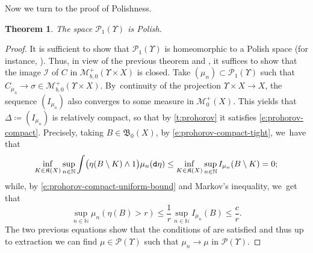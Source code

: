 \documentclass[JEP,XML,SOM,Unicode,published]{cedram}
\newtheorem{theorem}{Theorem}[section]
\theoremstyle{definition}
\theoremstyle{remark}
\DeclarePairedDelimiter{\paren}{\lparen}{\rparen}
\begin{document}
Now we turn to the proof of Polishness.

\begin{theorem}\label{t:p1-polish}
The space $\mathscr{P}_{1}(\varUpsilon)$ is Polish.
\end{theorem}
\begin{proof}
It is sufficient to show that $\mathscr{P}_{1}(\varUpsilon)$ is homeomorphic to a Polish space (for instance, \cite[IX, p.\,58, Cor.\,2]{BourbakiTopo2}).
Thus, in view of the previous theorem and \cite[IX, p.\,57, Prop.\,1]{BourbakiTopo2}, it suffices to show that the image $\mathscr{I}$ of $C$ in $\mathscr{M}^{+}_{b,0}(\varUpsilon \times X)$ is closed.
Take $(\mu_{n}) \subset \mathscr{P}_{1}(\varUpsilon)$ such that $C_{\mu_{n}} \to \sigma \in \mathscr{M}^{+}_{b,0}(\varUpsilon \times X)$.
By~continuity of the projection $\varUpsilon \times X \to X$, the sequence $(I_{\mu_{n}})$ also converges to some measure in $\mathscr{M}^{+}_{0}(X)$.
This yields that $\Delta \coloneq (I_{\mu_{n}})$ is relatively compact, so that by \cref{t:prohorov} it satisfies \cref{e:prohorov-compact}.
Precisely, taking $B \in \mathfrak{B}_{0}(X)$, by \cref{e:prohorov-compact-tight}, we~have that
\begin{equation*}
\inf_{K \in \mathfrak{K}(X)} \sup_{n \in \mathbb{N}} \int \paren[\big]{\eta(B \setminus K) \wedge 1} \mu_{n}(\mathtt{d} \eta) \leq \inf_{K \in \mathfrak{K}(X)} \sup_{n \in \mathbb{N}} I_{\mu_{n}}(B \setminus K) = 0;
\end{equation*}
while, by \cref{e:prohorov-compact-uniform-bound} and Markov's inequality, we~get that
\begin{equation*}
\sup_{n \in \mathbb{N}} \mu_{n}(\eta(B) > r) \leq \frac{1}{r} \sup_{n \in \mathbb{N}} I_{\mu_{n}}(B) \leq \frac{c}{r}.
\end{equation*}
The two previous equations show that the conditions of \cite[Th.\,4.10]{Kallenberg} are satisfied and thus up to extraction we can find $\mu \in \mathscr{P}(\varUpsilon)$ such that $\mu_{n} \to \mu$ in $\mathscr{P}(\varUpsilon)$.


\end{proof}
\end{document}
